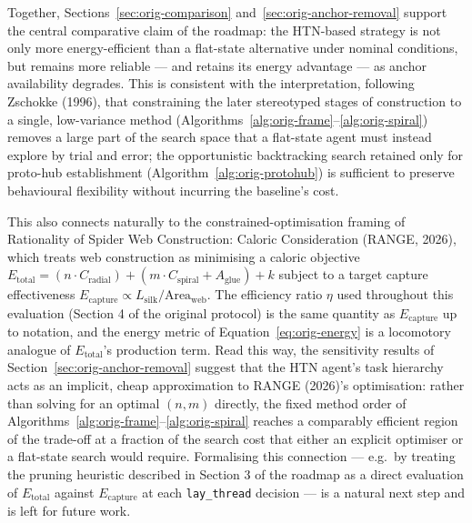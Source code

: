 Together, Sections~\ref{sec:orig-comparison} and~\ref{sec:orig-anchor-removal} support the central comparative claim of the roadmap: the HTN-based strategy is not only more energy-efficient than a flat-state alternative under nominal conditions, but remains more reliable --- and retains its energy advantage --- as anchor availability degrades. This is consistent with the interpretation, following Zschokke (1996), that constraining the later stereotyped stages of construction to a single, low-variance method (Algorithms~\ref{alg:orig-frame}--\ref{alg:orig-spiral}) removes a large part of the search space that a flat-state agent must instead explore by trial and error; the opportunistic backtracking search retained only for proto-hub establishment (Algorithm~\ref{alg:orig-protohub}) is sufficient to preserve behavioural flexibility without incurring the baseline's cost.

This also connects naturally to the constrained-optimisation framing of Rationality of Spider Web Construction: Caloric Consideration (RANGE, 2026), which treats web construction as minimising a caloric objective $E_{\mathrm{total}} = (n \cdot C_{\mathrm{radial}}) + (m \cdot C_{\mathrm{spiral}} + A_{\mathrm{glue}}) + k$ subject to a target capture effectiveness $E_{\mathrm{capture}} \propto L_{\mathrm{silk}}/\mathrm{Area}_{\mathrm{web}}$. The efficiency ratio $\eta$ used throughout this evaluation (Section 4 of the original protocol) is the same quantity as $E_{\mathrm{capture}}$ up to notation, and the energy metric of Equation~\eqref{eq:orig-energy} is a locomotory analogue of $E_{\mathrm{total}}$'s production term. Read this way, the sensitivity results of Section~\ref{sec:orig-anchor-removal} suggest that the HTN agent's task hierarchy acts as an implicit, cheap approximation to RANGE (2026)'s optimisation: rather than solving for an optimal $(n, m)$ directly, the fixed method order of Algorithms~\ref{alg:orig-frame}--\ref{alg:orig-spiral} reaches a comparably efficient region of the trade-off at a fraction of the search cost that either an explicit optimiser or a flat-state search would require. Formalising this connection --- e.g.\ by treating the pruning heuristic described in Section 3 of the roadmap as a direct evaluation of $E_{\mathrm{total}}$ against $E_{\mathrm{capture}}$ at each \texttt{lay\_thread} decision --- is a natural next step and is left for future work.

